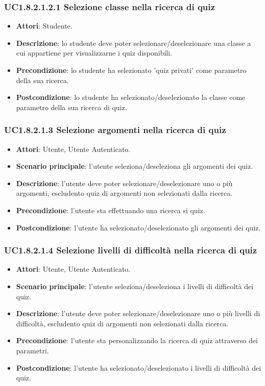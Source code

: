 \subsubsection{UC1.8.2.1.2.1 Selezione classe nella ricerca di quiz}
\begin{itemize}
\item \textbf{Attori}: Studente.
\item \textbf{Descrizione}: lo studente deve poter selezionare/deselezionare una classe a cui appartiene per visualizzarne i quiz disponibili.
\item \textbf{Precondizione}: lo studente ha selezionato 'quiz privati' come parametro della sua ricerca.
\item \textbf{Postcondizione}: lo studente ha selezionato/deselezionato la classe come parametro della sua ricerca di quiz.
\end{itemize}
\subsubsection{UC1.8.2.1.3 Selezione argomenti nella ricerca di quiz}
\begin{itemize}
\item \textbf{Attori}: Utente, Utente Autenticato.
\item \textbf{Scenario principale}: l'utente seleziona/deseleziona gli argomenti dei quiz.
\item \textbf{Descrizione}: l'utente deve poter selezionare/deselezionare uno o più argomenti, escludento quiz di argomenti non selezionati dalla ricerca.
\item \textbf{Precondizione}: l'utente sta effettuando una ricerca si quiz.
\item \textbf{Postcondizione}: l'utente ha selezionato/deselezionato gli argomenti dei quiz.
\end{itemize}
\subsubsection{UC1.8.2.1.4 Selezione livelli di difficoltà nella ricerca di quiz}
\begin{itemize}
\item \textbf{Attori}: Utente, Utente Autenticato.
\item \textbf{Scenario principale}: l'utente seleziona/deseleziona i livelli di difficoltà dei quiz.
\item \textbf{Descrizione}: l'utente deve poter selezionare/deselezionare uno o più livelli di difficoltà, escludento quiz di argomenti non selezionati dalla ricerca.
\item \textbf{Precondizione}: l'utente sta personalizzando la ricerca di quiz attraverso dei parametri.
\item \textbf{Postcondizione}: l'utente ha selezionato/deselezionato i livelli di difficoltà dei quiz.
\end{itemize}
